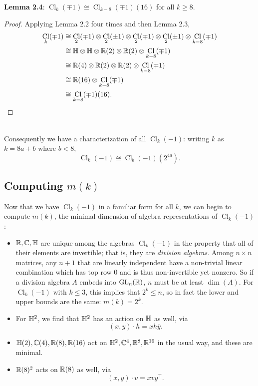 \documentclass{amsart}
\DeclareMathOperator{\Cl}{\mathrm{Cl}}
\begin{document}
\noindent \textbf{Lemma 2.4}: $\Cl_k(\mp 1) \cong \Cl_{k-8}(\mp 1)(16)$ for all $k\geq 8$.
\begin{proof}
	Applying Lemma 2.2 four times and then Lemma 2.3,
	\begin{align*}
		\Cl_k(\mp 1) &\cong \Cl_2(\mp 1) \otimes \Cl_2(\pm 1) \otimes \Cl_2(\mp 1) \otimes \Cl_2(\pm 1) \otimes \Cl_{k-8}(\mp 1)\\
		&\cong \HH \otimes \HH\otimes \R(2) \otimes \R(2) \otimes \Cl_{k-8}(\mp 1)\\
		&\cong \R(4) \otimes \R(2) \otimes \R(2) \otimes \Cl_{k-8}(\mp 1)\\
		&\cong \R(16) \otimes \Cl_{k-8}(\mp 1)\\
		&\cong \Cl_{k-8}(\mp 1)(16).
	\end{align*}
\end{proof}\\

Consequently we have a characterization of all $\Cl_k(-1)$: writing $k$ as $k=8a+b$ where $b<8$,
$$
\Cl_k(-1) \cong \Cl_b(-1)(2^{4a}).
$$
	

\subsection{Computing $m(k)$}
Now that we have $\Cl_k(-1)$ in a familiar form for all $k$, we can begin to compute $m(k)$, the minimal dimension of algebra representations of $\Cl_k(-1)$:

\begin{itemize} 
	\item $\mathbb{R},\mathbb{C},\mathbb{H}$ are unique among the algebras $\Cl_k(-1)$ in the property that all of their elements are invertible; that is, they are \textit{division algebras}. Among $n\times n$ matrices, any $n+1$ that are linearly independent have a non-trivial linear combination which has top row 0 and is thus non-invertible yet nonzero. So if a division algebra $A$ embeds into $\operatorname{GL}_n(\mathbb{R})$, $n$ must be at least $\dim(A)$. For $\Cl_k(-1)$ with $k\leq 3$, this implies that $2^k\leq n$, so in fact the lower and upper bounds are the same: $m(k)=2^k$.
	\item For $\mathbb{H}^2$, we find that $\mathbb{H}^2$ has an action on $\mathbb{H}$ as well, via
	$$
	(x,y)\cdot h = xh\bar{y}.
	$$
	\item $\mathbb{H}(2),\mathbb{C}(4),\mathbb{R}(8),\mathbb{R}(16)$ act on $\mathbb{H}^2,\mathbb{C}^4,\mathbb{R}^8,\mathbb{R}^{16}$ in the usual way, and these are minimal.
	\item $\mathbb{R}(8)^2$ acts on $\mathbb{R}(8)$ as well, via
	$$
	(x,y)\cdot v = xvy^{\top}.
	$$
	\end{itemize}
	
\end{document}
